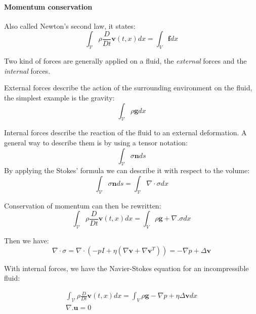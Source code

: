 \documentclass[11pt, oneside, a4paper]{memoir}
\begin{document}
\paragraph{Momentum conservation}

Also called Newton's second law, it states:
\begin{equation}
\label{eq:momentumConservation}
\int_{\mathcal{V}} \rho \frac{D}{Dt} \mathbf{v}(t,x) dx = \int_{V} \mathbf{f} dx
\end{equation}

Two kind of forces are generally applied on a fluid, the \emph{external} forces and the \emph{internal} forces.

External forces describe the action of the surrounding environment on the fluid, the simplest example is the gravity:
\begin{equation}
\int_{\mathcal{V}} \rho \mathbf{g} dx
\end{equation}

Internal forces describe the reaction of the fluid to an external deformation. A general way to describe them is by using a tensor notation:
\begin{equation}
\int_{\mathcal{V}} \sigma \mathbf{n} ds
\end{equation}
By applying the Stokes' formula we can describe it with respect to the volume:
\begin{equation}
\int_{\mathcal{V}} \sigma \mathbf{n} ds =
\int_{\mathcal{V}} \nabla \cdot \sigma dx
\end{equation}

Conservation of momentum can then be rewritten:
\begin{equation}
\int_{\mathcal{V}} \rho \frac{D}{Dt} \mathbf{v}(t,x) dx = \int_{V} \rho \mathbf{g} + \nabla. \sigma dx
\end{equation}

Then we have:
\begin{equation}
\nabla \cdot \sigma = \nabla \cdot \left( -pI + \eta \left( \nabla \mathbf{v} + \nabla \mathbf{v}^{T} \right) \right) = -\nabla p + \Delta \mathbf{v}
\end{equation}

With internal forces, we have the Navier-Stokes equation for an incompressible fluid:

\begin{equation}
\begin{array}{ll}
\int_{\mathcal{V}} \rho \frac{D}{Dt} \mathbf{v}(t,x) dx = \int_{V} \rho \mathbf{g} -\nabla p + \eta \Delta \mathbf{v} dx \\
\nabla. \mathbf{u} = 0
\end{array}
\end{equation}
\end{document}

